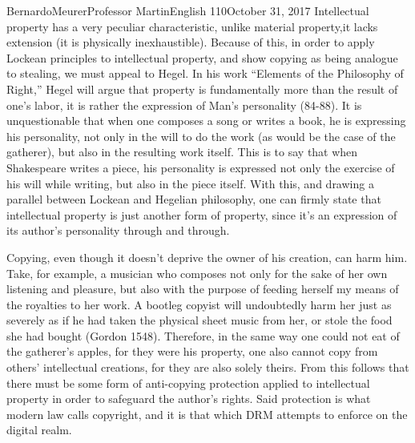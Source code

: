\documentclass[12pt,letterpaper]{article}
\begin{document}
\begin{mla}{Bernardo}{Meurer}{Professor Martin}{English 110}{October 31, 2017}
    Intellectual property has a very peculiar characteristic, unlike material property,it lacks extension (it is physically inexhaustible). Because of this, in order to apply Lockean principles to intellectual property, and show copying as being analogue to stealing, we must appeal to Hegel. In his work ``Elements of the Philosophy of Right,'' Hegel will argue that property is fundamentally more than the result of one's labor, it is rather the expression of Man's personality (84-88). It is unquestionable that when one composes a song or writes a book, he is expressing his personality, not only in the will to do the work (as would be the case of the gatherer), but also in the resulting work itself. This is to say that when Shakespeare writes a piece, his personality is expressed not only the exercise of his will while writing, but also in the piece itself. With this, and drawing a parallel between Lockean and Hegelian philosophy, one can firmly state that intellectual property is just another form of property, since it's an expression of its author's personality through and through. 

    Copying, even though it doesn't deprive the owner of his creation, can harm him. Take, for example, a musician who composes not only for the sake of her own listening and pleasure, but also with the purpose of feeding herself my means of the royalties to her work. A bootleg copyist will undoubtedly harm her just as severely as if he had taken the physical sheet music from her, or stole the food she had bought (Gordon 1548). Therefore, in the same way one could not eat of the gatherer's apples, for they were his property, one also cannot copy from others' intellectual creations, for they are also solely theirs. From this follows that there must be some form of anti-copying protection applied to intellectual property in order to safeguard the author's rights. Said protection is what modern law calls copyright, and it is that which DRM attempts to enforce on the digital realm.


\end{mla}
\end{document}
